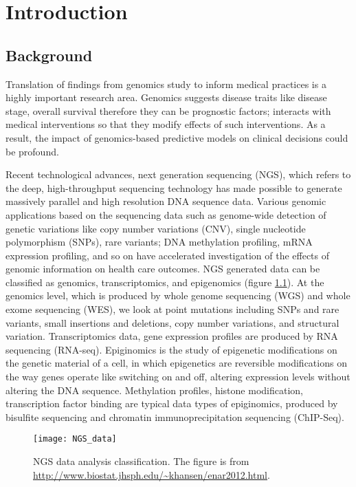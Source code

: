 \chapter{Introduction}
\label{cha:introduction}

\section{Background}
\label{sec:Background}

Translation of findings from genomics study to inform medical practices is a highly important research area. Genomics suggests disease traits like disease stage, overall survival therefore they can be prognostic factors; interacts with medical interventions so that they modify effects of such interventions. As a result, the impact of genomics-based predictive models on clinical decisions could be profound. 

Recent technological advances, next generation sequencing (NGS), which refers to the deep, high-throughput sequencing technology has made possible to generate massively parallel and high resolution DNA sequence data. Various genomic applications based on the sequencing data such as genome-wide detection of genetic variations like copy number variations (CNV), single nucleotide polymorphism (SNPs), rare variants; DNA methylation profiling, mRNA expression profiling, and so on have accelerated investigation of the effects of genomic information on health care outcomes. NGS generated data can be classified as genomics, transcriptomics, and epigenomics (figure \ref{fig:NGS_data}). At the genomics level, which is produced by whole genome sequencing (WGS) and whole exome sequencing (WES), we look at point mutations including SNPs and rare variants, small insertions and deletions, copy number variations, and structural variation. Transcriptomics data, gene expression profiles are produced by RNA sequencing (RNA-seq). Epiginomics is the study of epigenetic modifications on the genetic material of a cell, in which epigenetics are reversible modifications on the way genes operate like switching on and off, altering expression levels without altering the DNA sequence. Methylation profiles, histone modification, transcription factor binding are typical data types of epiginomics, produced by bisulfite sequencing and chromatin immunoprecipitation sequencing (ChIP-Seq). 

\begin{figure}[tbh]
  \centering
  \texttt{[image: NGS\_data]}
  \caption[NGS data analysis classification]{
    NGS data analysis classification. The figure is from \url{http://www.biostat.jhsph.edu/~khansen/enar2012.html}.
  }
  \label{fig:NGS_data}
\end{figure}

